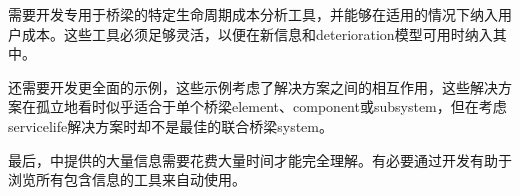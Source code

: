 
需要开发专用于桥梁的特定生命周期成本分析工具，并能够在适用的情况下纳入用户成本。这些工具必须足够灵活，以便在新信息和\gls*{deterioration}模型可用时纳入其中。


还需要开发更全面的示例，这些示例考虑了解决方案之间的相互作用，这些解决方案在孤立地看时似乎适合于单个桥梁\gls{element}、\gls{component}或\gls{subsystem}，但在考虑\gls{servicelife}解决方案时却不是最佳的联合桥梁\gls{system}。


最后，中提供的大量信息需要花费大量时间才能完全理解。有必要通过开发有助于浏览所有包含信息的工具来自动使用。
